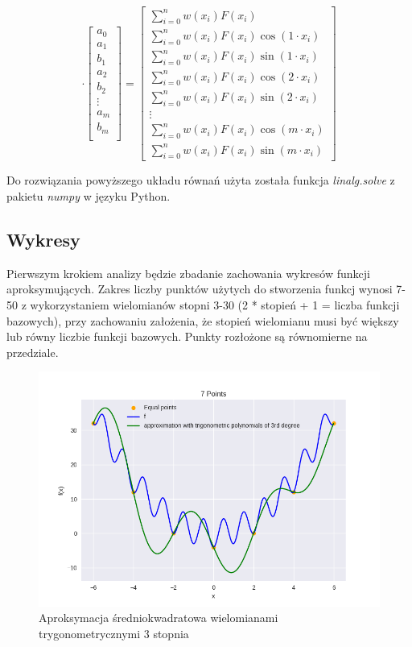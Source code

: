 \documentclass{article}
\begin{document}
\[
\cdot
\begin{bmatrix}
    a_0 \\
    a_1 \\
    b_1 \\
    a_2 \\
    b_2 \\
    \vdots \\
    a_m \\
    b_m \\ 
\end{bmatrix}
=
\begin{bmatrix}
    \sum_{i=0}^nw(x_i)F(x_i) \\
    \sum_{i=0}^nw(x_i)F(x_i)\cos(1\cdot x_i) \\
    \sum_{i=0}^nw(x_i)F(x_i)\sin(1\cdot x_i) \\
    \sum_{i=0}^nw(x_i)F(x_i)\cos(2\cdot x_i) \\
    \sum_{i=0}^nw(x_i)F(x_i)\sin(2\cdot x_i) \\
    \vdots \\
    \sum_{i=0}^nw(x_i)F(x_i)\cos(m\cdot x_i) \\ 
    \sum_{i=0}^nw(x_i)F(x_i)\sin(m\cdot x_i)
\end{bmatrix}    
\]

Do rozwiązania powyższego układu równań użyta została funkcja \textit{linalg.solve} z pakietu \textit{numpy}
w języku Python.

\subsection{Wykresy}
Pierwszym krokiem analizy będzie zbadanie zachowania wykresów funkcji aproksymujących. Zakres liczby punktów użytych do
stworzenia funkcj wynosi 7-50 z wykorzystaniem wielomianów stopni 3-30 (2 * stopień + 1 = liczba funkcji bazowych), przy 
zachowaniu założenia, że stopień wielomianu musi być większy lub równy liczbie funkcji bazowych. Punkty rozłożone są
równomierne na przedziale.

\begin{figure}[H]
    \centering
    \includegraphics[width=\textwidth]{img/tripoly_3_7.png}
    \caption{Aproksymacja średniokwadratowa wielomianami trygonometrycznymi 3 stopnia}
\end{figure}
\end{document}
